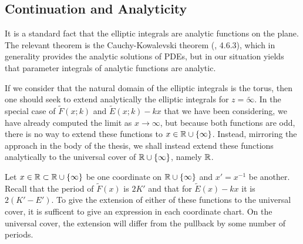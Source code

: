\subsection{Continuation and Analyticity}
\label{sub:EllipticContinuation}

It is a standard fact that the elliptic integrals are analytic functions on the plane. The relevant theorem is the Cauchy-Kowalevski theorem (\cite{Evans1998}, 4.6.3), which in generality provides the analytic solutions of PDEs, but in our situation yields that parameter integrals of analytic functions are analytic.

If we consider that the natural domain of the elliptic integrals is the torus, then one should seek to extend analytically the elliptic integrals for $z=\tilde\infty$. In the special case of $\tilde{F}(x;k)$ and $\tilde{E}(x;k) - kx$ that we have been considering, we have already computed the limit as $x \to \infty$, but because both functions are odd, there is no way to extend these functions to $x \in \mathbb{R}\cup\{\infty\}$. Instead, mirroring the approach in the body of the thesis, we shall instead extend these functions analytically to the universal cover of $\mathbb{R}\cup\{\infty\}$, namely $\mathbb{R}$.

Let $x \in \mathbb{R} \subset \mathbb{R}\cup\{\infty\}$ be one coordinate on $\mathbb{R}\cup\{\infty\}$ and $x' = x^{-1}$ be another. Recall that the period of $\tilde{F}(x)$ is $2K'$ and that for $\tilde{E}(x) - kx$ it is $2(K' - E')$. To give the extension of either of these functions to the universal cover, it is sufficent to give an expression in each coordinate chart. On the universal cover, the extension will differ from the pullback by some number of periods.


